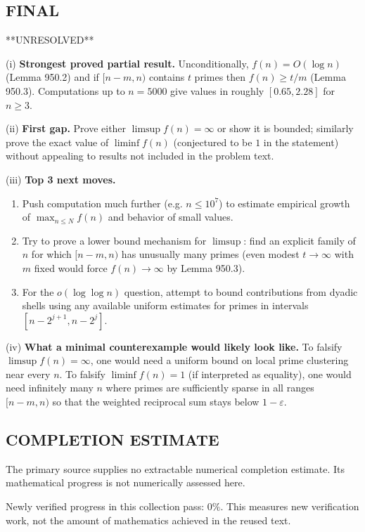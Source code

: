 \subsection*{FINAL}
**UNRESOLVED**

(i) \textbf{Strongest proved partial result.}
Unconditionally, $f(n)=O(\log n)$ (Lemma 950.2) and if $[n-m,n)$ contains $t$ primes then $f(n)\ge t/m$ (Lemma 950.3). Computations up to $n=5000$ give values in roughly $[0.65,2.28]$ for $n\ge3$.

(ii) \textbf{First gap.}
Prove either $\limsup f(n)=\infty$ or show it is bounded; similarly prove the exact value of $\liminf f(n)$ (conjectured to be $1$ in the statement) without appealing to results not included in the problem text.

(iii) \textbf{Top 3 next moves.}
\begin{enumerate}
\item Push computation much further (e.g. $n\le 10^7$) to estimate empirical growth of $\max_{n\le N} f(n)$ and behavior of small values.
\item Try to prove a lower bound mechanism for $\limsup$: find an explicit family of $n$ for which $[n-m,n)$ has unusually many primes (even modest $t\to\infty$ with $m$ fixed would force $f(n)\to\infty$ by Lemma 950.3).
\item For the $o(\log\log n)$ question, attempt to bound contributions from dyadic shells using any available uniform estimates for primes in intervals $[n-2^{j+1},n-2^j]$.
\end{enumerate}

(iv) \textbf{What a minimal counterexample would likely look like.}
To falsify $\limsup f(n)=\infty$, one would need a uniform bound on local prime clustering near every $n$. To falsify $\liminf f(n)=1$ (if interpreted as equality), one would need infinitely many $n$ where primes are sufficiently sparse in all ranges $[n-m,n)$ so that the weighted reciprocal sum stays below $1-\varepsilon$.




\subsection*{COMPLETION ESTIMATE}
The primary source supplies no extractable numerical completion estimate. Its mathematical progress is not numerically assessed here.

Newly verified progress in this collection pass: $0\%$. This measures new verification work, not the amount of mathematics achieved in the reused text.
